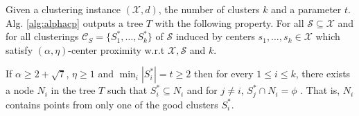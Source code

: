 \documentclass[11pt]{article}
\newcommand{\mc}{\mathcal}
\begin{document}
\begin{theorem}
\label{thm:alphacpnoise}
Given a clustering instance $(\mc X, d)$, the number of clusters $k$ and a parameter $t$. Alg. \ref{alg:alphacp} outputs a tree $T$ with the following property. For all $\mc S \subseteq \mc X$ and for all clusterings $\mc C_S = \{S_1^*, \ldots, S_k^*\}$ of $\mc S$ induced by centers $s_1, \ldots, s_k \in \mc X$ which satisfy $(\alpha, \eta)$-center proximity w.r.t $\mc X, \mc S$ and $k$. 

If $\alpha \ge 2 + \sqrt 7$, $\eta \ge 1$ and $ \min_i|S_i^*| = t \ge 2$ then for every $1\le i \le k$, there exists a node $N_i$ in the tree $T$ such that $S_i^* \subseteq N_i$ and for $j \neq i$, $S_j^* \cap N_i = \phi$ . That is, $N_i$ contains points from only one of the good clusters $S_i^*$.
\end{theorem}
\end{document}
